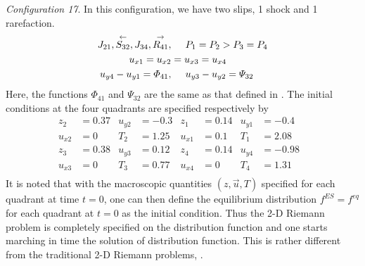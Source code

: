 \documentclass{rsproca}%
\begin{document}
{\em Configuration 17}.
In this configuration, we have two slips, 1 shock and 1 rarefaction.
\begin{align*}
J_{21},\stackrel{\leftarrow}{S_{32}},J_{34},\stackrel{\rightarrow}{R_{41}},&\hspace{0.2in}P_1=P_2>P_3=P_4  \\
u_{x1}=u_{x2}&=u_{x3}=u_{x4}\\
u_{y4}-u_{y1}=\Phi_{41},&\hspace{0.2in}u_{y3}-u_{y2}=\Psi_{32}
\end{align*}
Here, the functions $\Phi_{41}$ and $\Psi_{32}$ are the same as that defined in \cite{schultzrinne}.  The initial conditions at the four quadrants are specified respectively by
\begin{align*}
z_2		&=0.37& u_{y2}	&=-0.3& z_1		 	&=0.14& 	u_{y1}	&=-0.4& 	\\
u_{x2}&=0& 		T_2			&=1.25& u_{x1}	&=0.1& 		T_1			&=2.08&		\\
z_3		&=0.38& u_{y3}	&=0.12& z_4			&=0.14&		u_{y4}	&=-0.98& 	\\
u_{x3}&=0& 		T_3			&=0.77& u_{x4}	&=0& 			T_4			&=1.31&		\\
\end{align*}
It is noted that with the macroscopic quantities $(z, \vec u, T)$ specified for each quadrant at time $t=0$, one can then define the equilibrium distribution $f^{ES}=f^{eq}$ for each quadrant at $t=0$ as the initial condition.  Thus the 2-D Riemann problem is completely specified on the distribution function and one starts marching in time the solution of distribution function.  This is rather different from the traditional 2-D Riemann problems, \cite{Laxliu95}  \cite{schultzrinne}.
\end{document}
